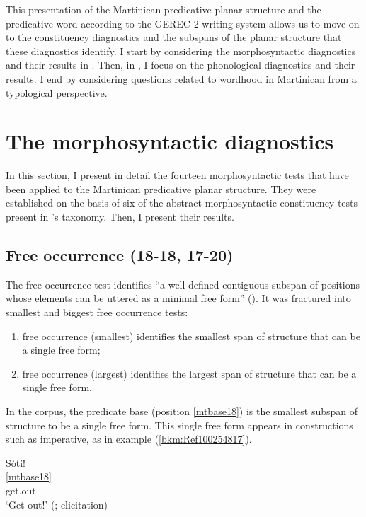 \documentclass[output=paper]{langscibook}
\begin{document}
This presentation of the Martinican predicative planar structure and the predicative word according to the GEREC-2 writing system allows us to move on to the constituency diagnostics and the subspans of the planar structure that these diagnostics identify.  I start by considering the morphosyntactic diagnostics and their results in . Then, in , I focus on the phonological diagnostics and their results. I end by considering questions related to wordhood in Martinican from a typological perspective.


\section{The morphosyntactic diagnostics}
\label{bkm:Ref77669555}
In this section, I present in detail the fourteen morphosyntactic tests that have been applied to the Martinican predicative planar structure. They were established on the basis of six of the abstract morphosyntactic constituency tests present in \citet[16]{tallman2021constituency}'s taxonomy. Then, I present their results. 

\subsection{Free occurrence (18-18, 17-20)}

The free occurrence test identifies “a well-defined contiguous subspan of positions whose elements can be uttered as a minimal free form'' (\citealt[16]{tallman2021constituency}). It was fractured into smallest and biggest free occurrence tests:

\begin{enumerate}
\item free occurrence (smallest) identifies the smallest span of structure that can be a single free form;
\item free occurrence (largest) identifies the largest span of structure that can be a single free form.
\end{enumerate}

In the corpus, the predicate base (position \ref{mtbase18}) is the smallest subspan of structure to be a single free form. This single free form appears in constructions such as imperative, as in example (\ref{bkm:Ref100254817}).


\ea\label{bkm:Ref100254817}
\glll Sòti!\\
    \ref{mtbase18} \\ 
     get.out\\
\glt `Get out!' (\citealt[462]{Bernabe1983}; elicitation)
\z
\end{document}
